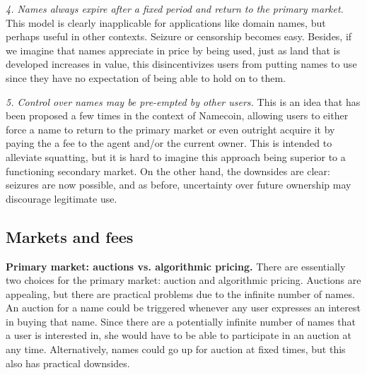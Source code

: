 {\em 4. Names always expire after a fixed period and return to the primary market.} This model is clearly inapplicable for applications like domain names, but perhaps useful in other contexts. Seizure or censorship becomes easy. Besides, if we imagine that names appreciate in price by being used, just as land that is developed increases in value, this disincentivizes users from putting names to use since they have no expectation of being able to hold on to them. 


{\em 5. Control over names may be pre-empted by other users.} 
This is an idea that has been proposed a few times in the context of Namecoin, allowing users to either force a name to return to the primary market or even outright acquire it by paying the a fee to the agent and/or the current owner. This is intended to alleviate squatting, but it is hard to imagine this approach being superior to a functioning secondary market. On the other hand, the downsides are clear: seizures are now possible, and as before, uncertainty over future ownership may discourage legitimate use.


\subsection{Markets and fees}

{\bf Primary market: auctions vs. algorithmic pricing.} There are essentially two choices for the primary market: auction and algorithmic pricing. Auctions are appealing, but there are practical problems due to the infinite number of names. An auction for a name could be triggered whenever any user expresses an interest in buying that name. Since there are a potentially infinite number of names that a user is interested in, she would have to be able to participate in an auction at any time. Alternatively, names could go up for auction at fixed times, but this also has practical downsides.

